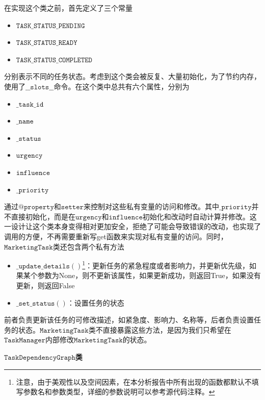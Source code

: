\documentclass[cn,hazy,blue,10pt,normal]{elegantnote}
\begin{document}
在实现这个类之前，首先定义了三个常量
\begin{itemize}
    \item $\mathtt{TASK\_STATUS\_PENDING}$
    \item $\mathtt{TASK\_STATUS\_READY}$
    \item $\mathtt{TASK\_STATUS\_COMPLETED}$
\end{itemize}
分别表示不同的任务状态。考虑到这个类会被反复、大量初始化，为了节约内存，使用了$\mathtt{\_\_slots\_\_}$命令。在这个类中总共有六个属性，分别为
\begin{itemize}
    \item $\mathtt{\_task\_id}$
    \item $\mathtt{\_name}$
    \item $\mathtt{\_status}$
    \item $\mathtt{urgency}$
    \item $\mathtt{influence}$
    \item $\mathtt{\_priority}$
\end{itemize}
通过$\mathtt{@property}$和$\mathtt{setter}$来控制对这些私有变量的访问和修改。其中$\mathtt{\_priority}$并不直接初始化，而是在$\mathtt{urgency}$和$\mathtt{influence}$初始化和改动时自动计算并修改。这一设计让这个类本身变得相对更加安全，拒绝了可能会导致错误的改动，也实现了调用的方便，不再需要重新写get函数来实现对私有变量的访问。同时，$\mathtt{MarketingTask}$类还包含两个私有方法
\begin{itemize}
    \item $\mathtt{\_update\_details()}$\footnote{注意，由于美观性以及空间因素，在本分析报告中所有出现的函数都默认不填写参数名和参数类型，详细的参数说明可以参考源代码注释。}：更新任务的紧急程度或者影响力，并更新优先级，如果某个参数为None，则不更新该属性，如果更新成功，则返回True，如果没有更新，则返回False
    \item $\mathtt{\_set\_status()}$：设置任务的状态
\end{itemize}
前者负责更新该任务的可修改描述，如紧急度、影响力、名称等，后者负责设置任务的状态。$\mathtt{MarketingTask}$类不直接暴露这些方法，是因为我们只希望在$\mathtt{TaskManager}$内部修改$\mathtt{MarketingTask}$的状态。

\textbf{$\mathtt{TaskDependencyGraph}$类}
\end{document}
